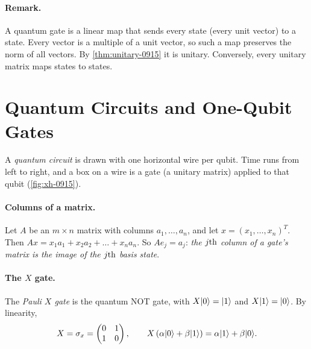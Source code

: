 
\paragraph{Remark.} A quantum gate is a linear map that sends every state (every unit vector) to a
state. Every vector is a multiple of a unit vector, so such a map preserves the norm of all vectors.
By \cref{thm:unitary-0915} it is unitary. Conversely, every unitary matrix maps states to states.

\section{Quantum Circuits and One-Qubit Gates}

A \emph{quantum circuit} is drawn with one horizontal wire per qubit. Time runs from left to right,
and a box on a wire is a gate (a unitary matrix) applied to that qubit (\cref{fig:xh-0915}).

\paragraph{Columns of a matrix.} Let $A$ be an $m \times n$ matrix with columns $a_1, \dots, a_n$,
and let $x = (x_1, \dots, x_n)^T$. Then $A x = x_1 a_1 + x_2 a_2 + \dots + x_n a_n$. So
$A e_j = a_j$: \emph{the $j\text{th}$ column of a gate's matrix is the image of the $j\text{th}$ basis
state}.

\paragraph{The $X$ gate.} The \emph{Pauli $X$ gate} is the quantum NOT gate, with
$X \lvert 0 \rangle = \lvert 1 \rangle$ and $X \lvert 1 \rangle = \lvert 0 \rangle$. By linearity,
\[X = \sigma_x = \begin{pmatrix} 0 & 1 \\ 1 & 0 \end{pmatrix},
    \qquad
    X \left(\alpha \lvert 0 \rangle + \beta \lvert 1 \rangle\right) = \alpha \lvert 1 \rangle + \beta \lvert 0 \rangle.\]

